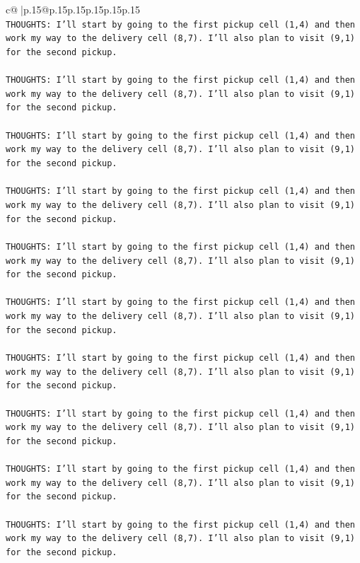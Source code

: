 \documentclass{article}
\begin{document}
{\begin{supertabular}{c@{$\;$}|p{.15\linewidth}@{}p{.15\linewidth}p{.15\linewidth}p{.15\linewidth}p{.15\linewidth}p{.15\linewidth}}
{{{\\ 
\texttt{THOUGHTS: I'll start by going to the first pickup cell (1,4) and then work my way to the delivery cell (8,7). I'll also plan to visit (9,1) for the second pickup.} \\
\\ 
\texttt{THOUGHTS: I'll start by going to the first pickup cell (1,4) and then work my way to the delivery cell (8,7). I'll also plan to visit (9,1) for the second pickup.} \\
\\ 
\texttt{THOUGHTS: I'll start by going to the first pickup cell (1,4) and then work my way to the delivery cell (8,7). I'll also plan to visit (9,1) for the second pickup.} \\
\\ 
\texttt{THOUGHTS: I'll start by going to the first pickup cell (1,4) and then work my way to the delivery cell (8,7). I'll also plan to visit (9,1) for the second pickup.} \\
\\ 
\texttt{THOUGHTS: I'll start by going to the first pickup cell (1,4) and then work my way to the delivery cell (8,7). I'll also plan to visit (9,1) for the second pickup.} \\
\\ 
\texttt{THOUGHTS: I'll start by going to the first pickup cell (1,4) and then work my way to the delivery cell (8,7). I'll also plan to visit (9,1) for the second pickup.} \\
\\ 
\texttt{THOUGHTS: I'll start by going to the first pickup cell (1,4) and then work my way to the delivery cell (8,7). I'll also plan to visit (9,1) for the second pickup.} \\
\\ 
\texttt{THOUGHTS: I'll start by going to the first pickup cell (1,4) and then work my way to the delivery cell (8,7). I'll also plan to visit (9,1) for the second pickup.} \\
\\ 
\texttt{THOUGHTS: I'll start by going to the first pickup cell (1,4) and then work my way to the delivery cell (8,7). I'll also plan to visit (9,1) for the second pickup.} \\
\\ 
\texttt{THOUGHTS: I'll start by going to the first pickup cell (1,4) and then work my way to the delivery cell (8,7). I'll also plan to visit (9,1) for the second pickup.} \\
\\ 
}}}
\end{supertabular}}
\end{document}

